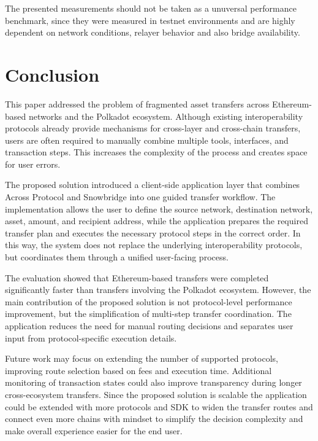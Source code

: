 \documentclass[conference]{IEEEtran}
\begin{document}
The presented measurements should not be taken as a unuversal performance benchmark, since they were measured in testnet environments and are highly dependent on network conditions, relayer behavior and also bridge availability.


\section{Conclusion}

This paper addressed the problem of fragmented asset transfers across Ethereum-based networks and the Polkadot ecosystem. Although existing interoperability protocols already provide mechanisms for cross-layer and cross-chain transfers, users are often required to manually combine multiple tools, interfaces, and transaction steps. This increases the complexity of the process and creates space for user errors.

The proposed solution introduced a client-side application layer that combines Across Protocol and Snowbridge into one guided transfer workflow. The implementation allows the user to define the source network, destination network, asset, amount, and recipient address, while the application prepares the required transfer plan and executes the necessary protocol steps in the correct order. In this way, the system does not replace the underlying interoperability protocols, but coordinates them through a unified user-facing process.

The evaluation showed that Ethereum-based transfers were completed significantly faster than transfers involving the Polkadot ecosystem. However, the main contribution of the proposed solution is not protocol-level performance improvement, but the simplification of multi-step transfer coordination. The application reduces the need for manual routing decisions and separates user input from protocol-specific execution details.

Future work may focus on extending the number of supported protocols, improving route selection based on fees and execution time. Additional monitoring of transaction states could also improve transparency during longer cross-ecosystem transfers. Since the proposed solution is scalable the application could be extended with more protocols and SDK to widen the transfer routes and connect even more chains with mindset to simplify the decision complexity and make overall experience easier for the end user.















%

\end{document}
